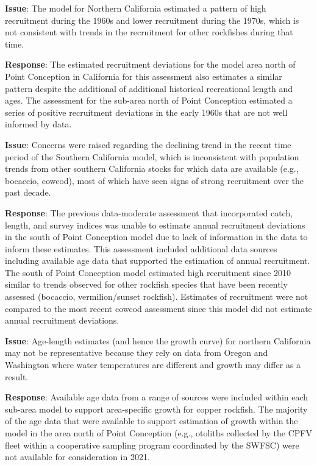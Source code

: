 \documentclass[11pt,
  english,
  letterpaper,
]{article}
\begin{document}
\textbf{Issue}: The model for Northern California estimated a pattern of high recruitment during the 1960s and lower recruitment during the 1970s, which is not consistent with trends in the recruitment for other rockfishes during that time.

\textbf{Response}: The estimated recruitment deviations for the model area north of Point Conception in California for this assessment also estimates a similar pattern despite the additional of additional historical recreational length and ages. The assessment for the sub-area north of Point Conception estimated a series of positive recruitment deviations in the early 1960s that are not well informed by data.

\textbf{Issue}: Concerns were raised regarding the declining trend in the recent time period of the Southern California model, which is inconsistent with population trends from other southern California stocks for which data are available (e.g., bocaccio, cowcod), most of which have seen signs of strong recruitment over the past decade.

\textbf{Response}: The previous data-moderate assessment that incorporated catch, length, and survey indices was unable to estimate annual recruitment deviations in the south of Point Conception model due to lack of information in the data to inform these estimates. This assessment included additional data sources including available age data that supported the estimation of annual recruitment. The south of Point Conception model estimated high recruitment since 2010 similar to trends observed for other rockfish species that have been recently assessed (bocaccio, vermilion/sunset rockfish). Estimates of recruitment were not compared to the most recent cowcod assessment since this model did not estimate annual recruitment deviations.

\textbf{Issue}: Age-length estimates (and hence the growth curve) for northern California may not be representative because they rely on data from Oregon and Washington where water temperatures are different and growth may differ as a result.

\textbf{Response}: Available age data from a range of sources were included within each sub-area model to support area-specific growth for copper rockfish. The majority of the age data that were available to support estimation of growth within the model in the area north of Point Conception (e.g., otoliths collected by the CPFV fleet within a cooperative sampling program coordinated by the SWFSC) were not available for consideration in 2021.
\end{document}
